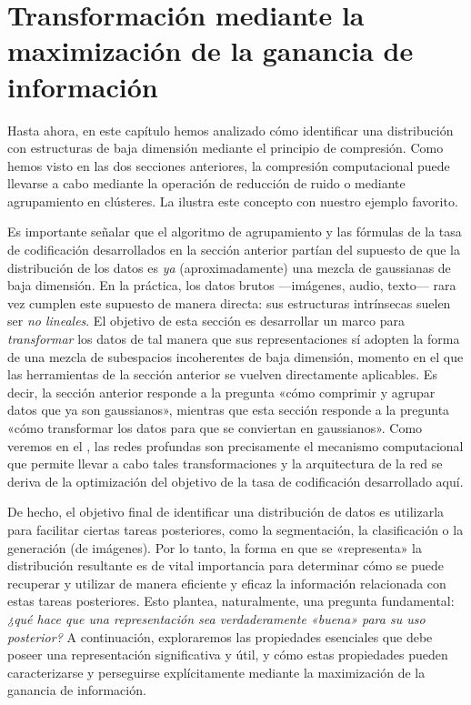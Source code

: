 \documentclass[../../book-main.tex]{subfiles}
\begin{document}
\section{Transformación mediante la maximización de la ganancia de información}
\label{sec:chap4-representation-learning-problem}

Hasta ahora, en este capítulo hemos analizado cómo identificar una
distribución con estructuras de baja dimensión mediante el principio de
compresión. Como hemos visto en las dos secciones anteriores,
la compresión computacional puede llevarse a cabo mediante la
operación de reducción de ruido o mediante agrupamiento en clústeres. La 
ilustra este concepto con nuestro ejemplo favorito.

Es importante señalar que el algoritmo de agrupamiento y las fórmulas de la tasa de codificación
desarrollados en la sección anterior partían del supuesto de que la distribución de los datos
es \textit{ya} (aproximadamente) una mezcla de gaussianas de baja dimensión.
En la práctica, los datos brutos —imágenes, audio, texto— rara vez cumplen este
supuesto de manera directa: sus estructuras intrínsecas suelen ser
\textit{no lineales}. El objetivo de esta sección es desarrollar un
marco para \textit{transformar} los datos de tal manera que sus representaciones
sí adopten la forma de una mezcla de subespacios incoherentes de baja dimensión,
momento en el que las herramientas de la sección anterior se vuelven directamente
aplicables. Es decir, la sección anterior responde a la pregunta «cómo comprimir
y agrupar datos que ya son gaussianos», mientras que esta sección
responde a la pregunta «cómo transformar los datos para que se conviertan en gaussianos». Como
veremos en el , las redes profundas son precisamente el
mecanismo computacional que permite llevar a cabo tales transformaciones y la
arquitectura de la red se deriva de la optimización del objetivo de la tasa de codificación
desarrollado aquí.

De hecho, el objetivo final de identificar una distribución de datos es utilizarla para
facilitar ciertas tareas posteriores, como la segmentación, la clasificación o la
generación (de imágenes). Por lo tanto, la forma en que se «representa» la distribución resultante
es de vital importancia para determinar cómo se puede recuperar y
utilizar de manera eficiente y eficaz la información relacionada con estas
tareas posteriores. Esto plantea, naturalmente, una pregunta fundamental: {\em ¿qué
hace que una representación sea verdaderamente «buena» para su uso posterior?} A
continuación, exploraremos las propiedades esenciales que debe poseer una representación
significativa y útil, y cómo estas propiedades
pueden caracterizarse y perseguirse explícitamente mediante la maximización de la ganancia de información.
\end{document}
